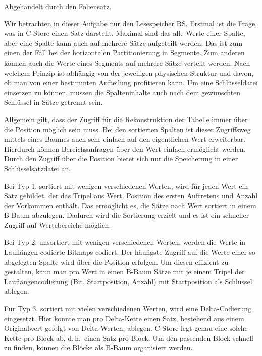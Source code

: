 \begin{enumerate}[a)]
\begin{note}
	Abgehandelt durch den Foliensatz.
\end{note}

	\begin{solution}
	Wir betrachten in dieser Aufgabe nur den Lesespeicher RS. Erstmal ist die Frage, was in C-Store einen Satz darstellt. Maximal sind das alle Werte einer Spalte, aber eine Spalte kann auch auf mehrere Sätze aufgeteilt werden. Das ist zum einen der Fall bei der horizontalen Partitionierung in Segmente. Zum anderen können auch die Werte eines Segments auf mehrere Sätze verteilt werden. Nach welchem Prinzip ist abhängig von der jeweiligen physischen Struktur und davon, ob man von einer bestimmten Aufteilung profitieren kann. Um eine Schlüsseldatei einsetzen zu können, müssen die Spalteninhalte auch nach dem gewünschten Schlüssel in Sätze getrennt sein.

	Allgemein gilt, dass der Zugriff für die Rekonstruktion der Tabelle immer über die Position möglich sein muss.
	Bei den sortierten Spalten ist dieser Zugriffsweg mittels eines Baumes auch sehr einfach auf den eigentlichen Wert erweiterbar.
	Hierdurch können Bereichsanfragen über den Wert einfach ermöglicht werden.
	Durch den Zugriff über die Position bietet sich nur die Speicherung in einer Schlüsselsatzdatei an.

	Bei Typ 1, sortiert mit wenigen verschiedenen Werten, wird für jeden Wert ein Satz gebildet, der das Tripel aus Wert, Position des ersten Auftretens und Anzahl der Vorkommen enthält.
	Das ermöglicht es, die Sätze nach Wert sortiert in einem B-Baum abzulegen.
	Dadurch wird die Sortierung erzielt und es ist ein schneller Zugriff auf Wertebereiche möglich.

	Bei Typ 2, unsortiert mit wenigen verschiedenen Werten, werden die Werte in Lauflängen-codierte Bitmaps codiert.
	Der häufigste Zugriff auf die Werte einer so abgelegten Spalte wird über die Position erfolgen.
	Um diesen effizient zu gestalten, kann man pro Wert in einen B-Baum Sätze mit je einem Tripel der Lauflängencodierung (Bit, Startposition, Anzahl) mit Startposition als Schlüssel ablegen.

	Für Typ 3, sortiert mit vielen verschiedenen Werten, wird eine Delta-Codierung eingesetzt.
	Hier könnte man pro Delta-Kette einen Satz, bestehend aus einem Originalwert gefolgt von Delta-Werten, ablegen.
	C-Store legt genau eine solche Kette pro Block ab, d.\,h.\ einen Satz pro Block.
	Um den passenden Block schnell zu finden, können die Blöcke als B-Baum organisiert werden.


\end{solution}
\end{enumerate}

